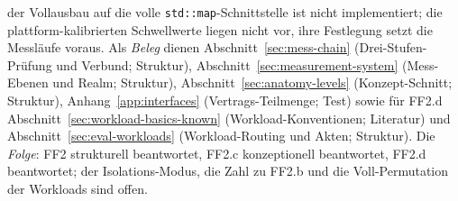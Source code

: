 \begin{nurlang}
der Vollausbau auf die volle \texttt{std::map}-Schnittstelle ist nicht implementiert; die
plattform-kalibrierten Schwellwerte liegen nicht vor, ihre Festlegung setzt die Messläufe
voraus. Als \emph{Beleg} dienen Abschnitt~\ref{sec:mess-chain} (Drei-Stufen-Prüfung und
Verbund; Struktur), Abschnitt~\ref{sec:measurement-system} (Mess-Ebenen und Realm; Struktur),
Abschnitt~\ref{sec:anatomy-levels} (Konzept-Schnitt; Struktur), Anhang~\ref{app:interfaces}
(Vertrags-Teilmenge; Test) sowie für FF2.d Abschnitt~\ref{sec:workload-basics-known}
(Workload-Konventionen; Literatur) und Abschnitt~\ref{sec:eval-workloads} (Workload-Routing und Akten;
Struktur). Die \emph{Folge}: FF2 strukturell beantwortet, FF2.c konzeptionell beantwortet, FF2.d
beantwortet; der Isolations-Modus, die Zahl zu FF2.b und die Voll-Permutation der Workloads sind offen.
\end{nurlang}
